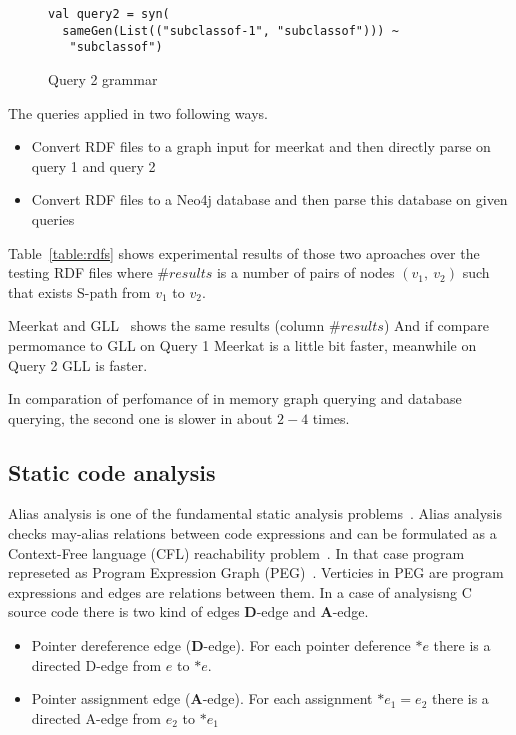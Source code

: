 \begin{figure}[h]
\begin{lstlisting}
val query2 = syn(
  sameGen(List(("subclassof-1", "subclassof"))) ~
   "subclassof")
\end{lstlisting}
\caption{Query 2 grammar}
\label{fig:query2Gen}
\end{figure}

The queries applied in two following ways.
\begin{itemize}
    \item Convert RDF files to a graph input for meerkat and then directly parse on query 1 and query 2
    \item Convert RDF files to a Neo4j database and then parse this database on given queries
\end{itemize} 

Table~\ref{table:rdfs} shows experimental results of those two aproaches over the testing RDF files where $\#results$ is a number of pairs of nodes $(v_1,\ v_2)$ such that exists S-path from $v_1$ to $v_2$.

Meerkat and GLL~\cite{GrigorevR16} shows the same results (column $\#results$)
And if compare permomance to GLL on Query 1 Meerkat is a little bit faster, meanwhile on Query 2 GLL is faster.

In comparation of perfomance of in memory graph querying and database querying, the second one is slower in about $2-4$ times.


\subsection{Static code analysis}

Alias analysis is one of the fundamental static analysis problems~\cite{Marlowe}.
Alias analysis checks may-alias relations between code expressions and can be formulated as a Context-Free language (CFL) reachability problem~\cite{Reps}.
In that case program represeted as Program Expression Graph (PEG)~\cite{Zheng}.
Verticies in PEG are program expressions and edges are relations between them.
In a case of analysisng C source code there is two kind of edges \textbf{D}-edge and \textbf{A}-edge.

\begin{itemize}
    \item Pointer dereference edge (\textbf{D}-edge). For each pointer deference $*e$ there is a directed D-edge from $e$ to $*e$.
    \item Pointer assignment edge (\textbf{A}-edge). For each assignment $*e_1=e_2$ there is a directed A-edge from $e_2$ to $*e_1$
\end{itemize}

